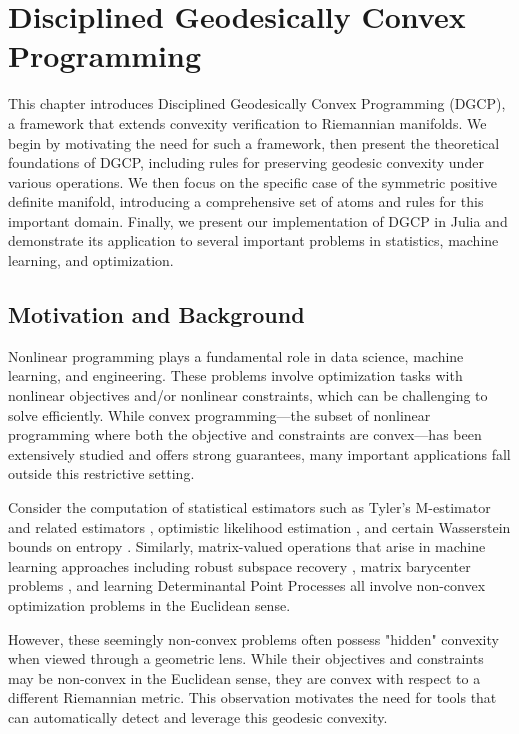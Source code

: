 \chapter{Disciplined Geodesically Convex Programming}

This chapter introduces Disciplined Geodesically Convex Programming (DGCP), a framework that extends convexity verification to Riemannian manifolds. We begin by motivating the need for such a framework, then present the theoretical foundations of DGCP, including rules for preserving geodesic convexity under various operations. We then focus on the specific case of the symmetric positive definite manifold, introducing a comprehensive set of atoms and rules for this important domain. Finally, we present our implementation of DGCP in Julia and demonstrate its application to several important problems in statistics, machine learning, and optimization.

\section{Motivation and Background}

Nonlinear programming plays a fundamental role in data science, machine learning, and engineering. These problems involve optimization tasks with nonlinear objectives and/or nonlinear constraints, which can be challenging to solve efficiently. While convex programming—the subset of nonlinear programming where both the objective and constraints are convex—has been extensively studied and offers strong guarantees, many important applications fall outside this restrictive setting.

Consider the computation of statistical estimators such as Tyler's M-estimator and related estimators \cite{Tyler1987, Wiesel2012, Ollila2014}, optimistic likelihood estimation \cite{Nguyen2019}, and certain Wasserstein bounds on entropy \cite{Courtade2017}. Similarly, matrix-valued operations that arise in machine learning approaches including robust subspace recovery \cite{Zhang2016}, matrix barycenter problems \cite{Bhatia1997}, and learning Determinantal Point Processes \cite{Mariet2015} all involve non-convex optimization problems in the Euclidean sense.

However, these seemingly non-convex problems often possess "hidden" convexity when viewed through a geometric lens. While their objectives and constraints may be non-convex in the Euclidean sense, they are convex with respect to a different Riemannian metric. This observation motivates the need for tools that can automatically detect and leverage this geodesic convexity.

